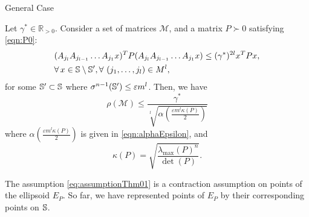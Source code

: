 \begin{subsection}{General Case}
\begin{thm}\label{thm:mainTheorem01}
Let $\gamma^* \in \mathbb{R}_{> 0}$. Consider a set of matrices $\mathcal{M}$, and a matrix $P \succ 0$ satisfying \eqref{eqn:P0}:
\begin{equation}\label{eq:assumptionThm01}
\begin{aligned}
& (A_{j_l} A_{j_{l-1}} \dots A_{j_1} x)^T P(A_{j_l} A_{j_{l-1}} \dots A_{j_1} x) \leq (\gamma^*)^{2l} x^T P x,\\
& \forall\, x \in \mathbb{S} \setminus \mathbb{S}', \forall\ (j_1, \dotsc, j_l) \in M^l,
\end{aligned}
\end{equation}
for some $\mathbb{S}' \subset \mathbb{S}$ where $\sigma^{n-1}(\mathbb{S}') \leq \varepsilon m^l$. Then, we have 
$$\rho(\mathcal{M}) \leq \frac{\gamma^{*}}{\sqrt[l]{\alpha \left( \frac{\varepsilon m^l \kappa(P)}{2} \right)}}$$
where $\alpha(\frac{\varepsilon m^l \kappa(P)}{2})$ is given in \eqref{eqn:alphaEpsilon}, and $$\kappa(P) = \sqrt{\frac{\lambda_{\max}(P)^n}{\det(P)}}.$$
\end{thm}

\begin{pf}

The assumption \eqref{eq:assumptionThm01} is a contraction assumption on points of the ellipsoid $E_P$. So far, we have represented points of $E_P$ by their corresponding points on $\mathbb{S}$. 


\end{pf}
\end{subsection}
